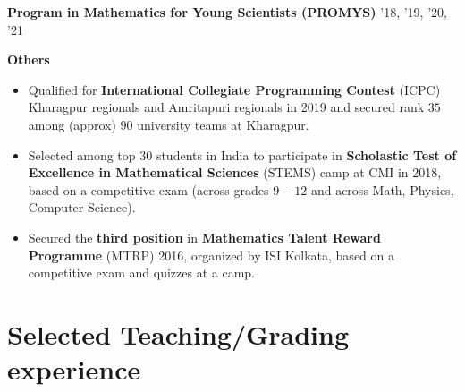 \resumeProjectHeading
{\textbf{Program in Mathematics for Young Scientists (PROMYS)}}
{'18, '19, '20, '21}
{\resumeItemListStart
{}
\resumeItemListEnd}



\vspace{\gap}
\resumeProjectHeading
{\textbf{Others}}
{}
{
\item 
\begin{itemize}[itemsep=-4pt, parsep=5pt, leftmargin=0.5cm]
\item {}  Qualified for \textbf{International Collegiate Programming Contest} (ICPC) Kharagpur regionals and Amritapuri regionals in 2019 and secured rank $35$ among (approx) $90$ university teams at Kharagpur.
        \item Selected among top $30$ students in India to participate in \textbf{Scholastic Test of Excellence in Mathematical Sciences} (STEMS) camp at CMI in 2018, based on a competitive exam (across grades $9-12$ and across Math, Physics, Computer Science).
        \item Secured the \textbf{third position} in \textbf{Mathematics Talent Reward Programme} (MTRP) 2016, organized by ISI Kolkata, based on a competitive exam and quizzes at a camp.
\end{itemize}}
\resumeSubHeadingListEnd
\vspace{-18pt}








\section{Selected Teaching/Grading experience}
\resumeSubHeadingListStart





